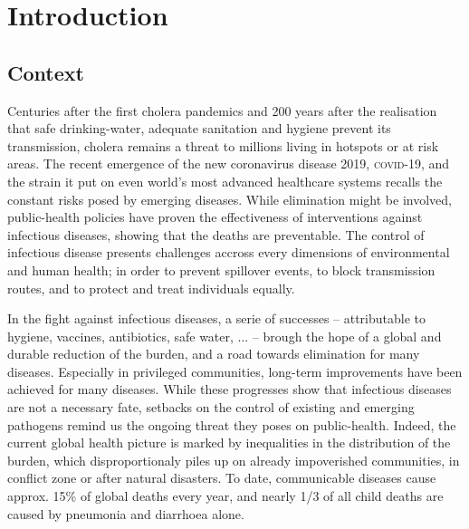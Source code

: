 \chapter*{Introduction} %
 \section{Context}
 Centuries after the first cholera pandemics and 200 years after the realisation that safe drinking-water, adequate sanitation and hygiene prevent its transmission, cholera remains a threat to millions living in hotspots or at risk areas. The recent emergence of the new coronavirus disease 2019, \textsc{covid}-19, and the strain it put on even world's most advanced healthcare systems recalls the constant risks posed by emerging diseases. 
While elimination might be involved, public-health policies have proven the effectiveness of interventions against infectious diseases, showing that the deaths are preventable. The control of infectious disease presents challenges accross every dimensions of environmental and human health; in order to prevent spillover events, to block transmission routes, and to protect and treat individuals equally. 

In the fight against infectious diseases, a serie of successes -- attributable to \eg hygiene, vaccines, antibiotics, safe water, ... -- brough the hope of a global and durable reduction of the burden, and a road towards elimination for many diseases. Especially in privileged communities, long-term improvements have been achieved for many diseases. While these progresses show that infectious diseases are not a necessary fate, setbacks on the control of existing and emerging pathogens remind us the ongoing threat they poses on public-health. Indeed, the current global health picture is marked by inequalities in the distribution of the burden, which disproportionaly piles up on already impoverished communities, in conflict zone or after natural disasters. To date, communicable diseases cause approx. 15\% of global deaths every year\cite[][Table 1, excl. non-transmissible neonatal and maternal diseases and nutritional diseases; pre-\textsc{covid}-19 estimates]{Roth:GlobalRegionalNational:2018}, and nearly 1/3 of all child deaths are caused by pneumonia and diarrhoea alone\cite[][\textsc{M} deaths among under 5, every year.]{WHO:EndingPreventableChild:2013}.
 
